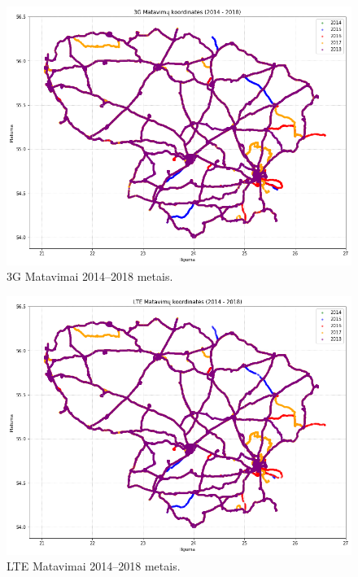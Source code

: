 \documentclass{VUMIFPSbakalaurinis}
\begin{document}
\begin{figure}[H]
	\centering
	\includegraphics[scale=0.5]{img/3G-0}
	\caption{3G Matavimai 2014–2018 metais.}
	\label{img:3G-0}
\end{figure}
\begin{figure}[H]
	\centering
	\includegraphics[scale=0.5]{img/LTE-0}
	\caption{LTE Matavimai 2014–2018 metais.}
	\label{img:LTE-0}
\end{figure}
\end{document}
